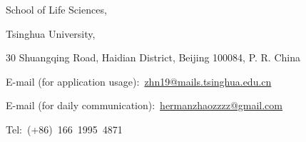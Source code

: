School of Life Sciences, 

Tsinghua University,

30 Shuangqing Road, Haidian District, Beijing 100084, P. R. China

E-mail (for application usage):~\href{mailto:zhn19@mails.tsinghua.edu.cn}{zhn19@mails.tsinghua.edu.cn}

E-mail (for daily communication):~\href{mailto:hermanzhaozzzz@gmail.com}{hermanzhaozzzz@gmail.com}

Tel:~(+86)~166~1995~4871
